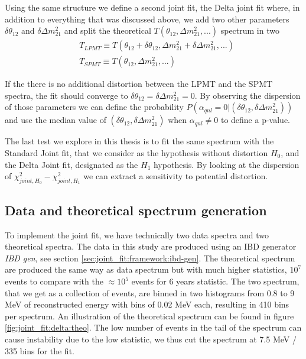 \documentclass[../main.tex]{subfiles}
\begin{document}
Using the same structure we define a second joint fit, the Delta joint fit where, in addition to everything that was discussed above, we add two other parameters $\delta \theta_{12}$ and $\delta \Delta m^2_{21}$ and split the theoretical $T(\theta_{12}, \Delta m^2_{21}, ...)$ spectrum in two
\begin{equation}
\begin{split}
           &T_{LPMT} \equiv T(\theta_{12} + \delta \theta_{12}, \Delta m^2_{21} + \delta \Delta m^2_{21}, ...) \\
           &T_{SPMT} \equiv T(\theta_{12}                     , \Delta m^2_{21}                         , ...)
\end{split}
\end{equation}

If the there is no additional distortion between the LPMT and the SPMT spectra, the fit should converge to $\delta \theta_{12} = \delta \Delta m^2_{21} = 0$. By observing the dispersion of those parameters we can define the probability $P(\alpha_{qnl} = 0 | (\delta \theta_{12}, \delta \Delta m^2_{21}))$ and use the median value of $(\delta \theta_{12}, \delta \Delta m^2_{21})$ when $\alpha_{qnl} \neq 0$ to define a p-value.

The last test we explore in this thesis is to fit the same spectrum with the Standard Joint fit, that we consider as the hypothesis without distortion $H_0$, and the Delta Joint fit, designated as the $H_1$ hypothesis. By looking at the dispersion of $\chi^2_{joint,H_0} - \chi^2_{joint,H_1}$ we can extract a sensitivity to potential distortion.

\subsection{Data and theoretical spectrum generation}
\label{sec:joint_fit:data_gen}

To implement the joint fit, we have technically two data spectra and two theoretical spectra. The data in this study are produced using an IBD generator \textit{IBD gen}, see section \ref{sec:joint_fit:framework:ibd-gen}. The theoretical spectrum are produced the same way as data spectrum but with much higher statistics, $10^7$ events to compare with the $\approx 10^5$ events for 6 years statistic. The two spectrum, that we get as a collection of events, are binned in two histograms from 0.8 to 9 MeV of reconstructed energy with bins of 0.02 MeV each, resulting in 410 bins per spectrum. An illustration of the theoretical spectrum can be found in figure \ref{fig:joint_fit:delta:theo}. The low number of events in the tail of the spectrum can cause instability due to the low statistic, we thus cut the spectrum at 7.5 MeV / 335 bins for the fit.
\end{document}
